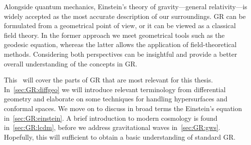 













Alongside quantum mechanics, Einstein's theory of gravity---general relativity---is widely accepted as the most accurate description of our surroundings. GR can be formulated from a geometrical point of view, or it can be viewed as a classical field theory. In the former approach we meet geometrical tools such as the geodesic equation, whereas the latter allows the application of field-theoretical methods. 
Considering both perspectives can be insightful and provide a better overall understanding of the concepts in GR.



This~ will cover the parts of GR that are most relevant for this thesis. In~\cref{sec:GR:diffgeo} we will introduce relevant terminology from differential geometry and elaborate on some techniques for handling hypersurfaces and conformal spaces. We move on to discuss in broad terms the Einstein's equation in~\cref{sec:GR:einstein}. A brief introduction to modern cosmology is found in~\cref{sec:GR:lcdm}, before we address gravitational waves in~\cref{sec:GR:gws}. Hopefully, this will sufficient to obtain a basic understanding of standard GR.





